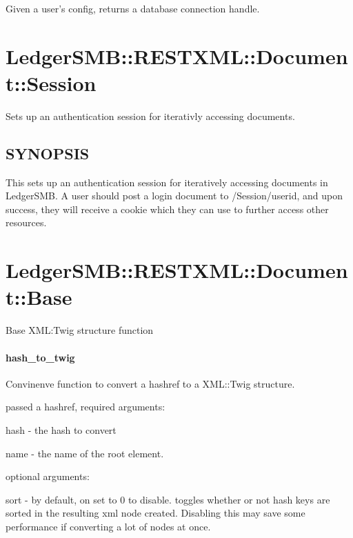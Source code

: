 \begin{description}
\begin{description}
\begin{description}
\begin{description}
\begin{description}
\begin{description}
\begin{description}
Given  a user's config, returns a database connection handle.

\section{LedgerSMB::RESTXML::Document::Session\label{LedgerSMB::RESTXML::Document::Session}}


Sets up an authentication session for iterativly accessing documents.

\subsection*{SYNOPSIS\label{LedgerSMB::RESTXML::Document::Session_SYNOPSIS}}


This sets up an authentication session for iteratively accessing documents in LedgerSMB.  A user should
post a login document to /Session/userid, and upon success, they will receive a cookie which they can use to further
access other resources.

\section{LedgerSMB::RESTXML::Document::Base\label{LedgerSMB::RESTXML::Document::Base}}


Base XML:Twig structure function

\paragraph*{hash\_to\_twig\label{LedgerSMB::RESTXML::Document::Base_hash_to_twig}}


Convinenve function to convert a hashref to a XML::Twig structure.



passed a hashref, required arguments:



hash - the hash to convert



name - the name of the root element.



optional arguments:



sort - by default, on set to 0 to disable.  toggles whether or not hash keys are sorted
in the resulting xml node created.  Disabling this may save some performance if converting a lot of
nodes at once.


\end{description}
\end{description}
\end{description}
\end{description}
\end{description}
\end{description}
\end{description}
